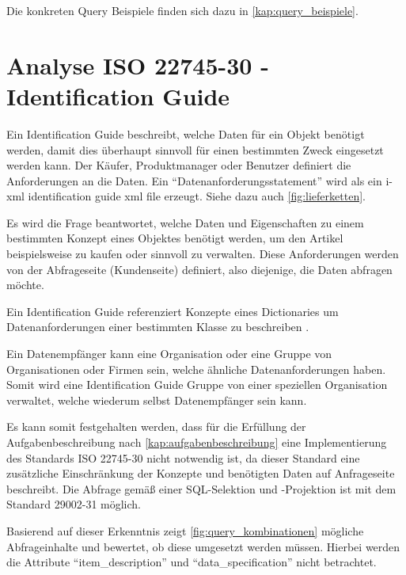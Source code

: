 Die konkreten Query Beispiele finden sich dazu in \autoref{kap:query_beispiele}.

\section{Analyse ISO 22745-30 - Identification Guide}\label{kap:identification_guide}

Ein Identification Guide beschreibt, welche Daten für ein Objekt benötigt werden, damit dies überhaupt sinnvoll für einen bestimmten Zweck eingesetzt werden kann. Der Käufer, Produktmanager oder Benutzer definiert die Anforderungen an die Daten. Ein  \enquote{Datenanforderungsstatement} wird als ein i-xml identification guide xml file erzeugt. Siehe dazu auch \autoref{fig:lieferketten}. 

Es wird die Frage beantwortet, welche Daten und Eigenschaften zu einem bestimmten Konzept eines Objektes benötigt werden, um den Artikel beispielsweise zu kaufen oder sinnvoll zu verwalten. Diese Anforderungen werden von der Abfrageseite (Kundenseite) definiert, also diejenige, die Daten abfragen möchte\citep[Vergl.][]{bensonQuality}. 

Ein Identification Guide referenziert Konzepte eines Dictionaries um Datenanforderungen einer bestimmten Klasse zu beschreiben \citep[Vergl.][Kap. 5]{iso22745-30}.

Ein Datenempfänger kann eine Organisation oder eine Gruppe von Organisationen oder Firmen sein, welche ähnliche Datenanforderungen haben. Somit wird eine Identification Guide Gruppe von einer speziellen Organisation verwaltet, welche wiederum selbst Datenempfänger sein kann.  

Es kann somit festgehalten werden, dass für die Erfüllung der Aufgabenbeschreibung nach \autoref{kap:aufgabenbeschreibung} eine Implementierung des Standards ISO 22745-30 nicht notwendig ist, da dieser Standard eine zusätzliche Einschränkung der Konzepte und benötigten Daten auf Anfrageseite beschreibt. 
Die Abfrage gemäß einer SQL-Selektion und -Projektion ist mit dem Standard 29002-31 möglich. 

Basierend auf dieser Erkenntnis zeigt \autoref{fig:query_kombinationen} mögliche Abfrageinhalte und bewertet, ob diese umgesetzt werden müssen. Hierbei werden die Attribute \enquote{item\_description} und \enquote{data\_specification} nicht betrachtet.

